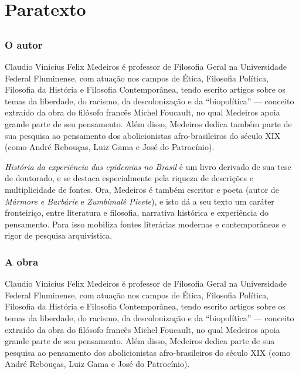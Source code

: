 \part{Paratexto}\label{paratexto}

\chapter*{}

\section{O autor}\label{o-autor}

Claudio Vinicius Felix Medeiros é professor de Filosofia Geral na
Universidade Federal Fluminense, com atuação nos campos de Ética,
Filosofia Política, Filosofia da História e Filosofia Contemporânea,
tendo escrito artigos sobre os temas da liberdade, do racismo, da
descolonização e da ``biopolítica'' --- conceito extraído da obra do
filósofo francês Michel Foucault, no qual Medeiros apoia grande parte de
seu pensamento. Além disso, Medeiros dedica também parte de sua pesquisa
ao pensamento dos abolicionistas afro-brasileiros do século XIX (como
André Rebouças, Luiz Gama e José do Patrocínio).

\textit{História da experiência das epidemias no Brasil} é um livro
derivado de sua tese de doutorado, e se destaca especialmente pela
riqueza de descrições e multiplicidade de fontes. Ora, Medeiros é também
escritor e poeta (autor de \textit{Mármore e Barbárie} e \textit{Zumbimalê
Pivete}), e isto dá a seu texto um caráter fronteiriço, entre literatura
e filosofia, narrativa histórica e experiência do pensamento. Para isso
mobiliza fontes literárias modernas e contemporâneas e rigor de pesquisa
arquivística.

\section{A obra}\label{a-obra}

Claudio Vinicius Felix Medeiros é professor de Filosofia Geral na
Universidade Federal Fluminense, com atuação nos campos de Ética,
Filosofia Política, Filosofia da História e Filosofia Contemporânea,
tendo escrito artigos sobre os temas da liberdade, do racismo, da
descolonização e da ``biopolítica'' --- conceito extraído da obra do
filósofo francês Michel Foucault, no qual Medeiros apoia grande parte de
seu pensamento. Além disso, Medeiros dedica parte de sua pesquisa ao
pensamento dos abolicionistas afro-brasileiros do século XIX (como André
Rebouças, Luiz Gama e José do Patrocínio).

